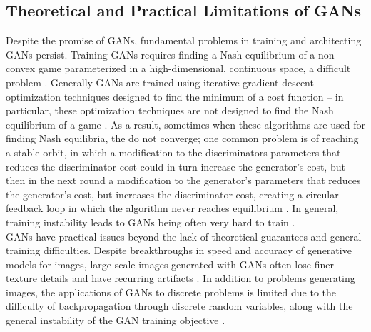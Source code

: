 \documentclass{article}
\begin{document}
\subsection{Theoretical and Practical Limitations of GANs}
Despite the promise of GANs, fundamental problems in training and architecting GANs persist. Training GANs requires finding a Nash equilibrium of a non convex game parameterized in a high-dimensional, continuous space, a difficult problem \citep{Goodfellow17} \citep{Salimans2016}. Generally GANs are trained using iterative gradient descent optimization techniques designed to find the minimum of a cost function – in particular, these optimization techniques are not designed to find the Nash equilibrium of a game \citep{Salimans2016}. As a result, sometimes when these algorithms are used for finding Nash equilibria, the do not converge; one common problem is of reaching a stable orbit, in which a modification to the discriminators parameters that reduces the discriminator cost could in turn increase the generator’s cost, but then in the next round a modification to the generator’s parameters that reduces the generator’s cost, but increases the discriminator cost, creating a circular feedback loop in which the algorithm never reaches equilibrium \citep{Salimans2016}. In general, training instability leads to GANs being often very hard to train \citep{DBLP:journals/corr/GulrajaniAADC17}.
\\
GANs have practical issues beyond the lack of theoretical guarantees and general training difficulties. Despite breakthroughs in speed and accuracy of generative models for images, large scale images generated with GANs often lose finer texture details and have recurring artifacts \citep{DBLP:journals/corr/LedigTHCATTWS16} \citep{Salimans2016} \citep{DBLP:journals/corr/ShrivastavaPTSW16}. In addition to problems generating images, the applications of GANs to discrete problems is limited due to the difficulty of backpropagation through discrete random variables, along with the general instability of the GAN training objective \citep{Che+al-2017-augmented}. 
\end{document}

